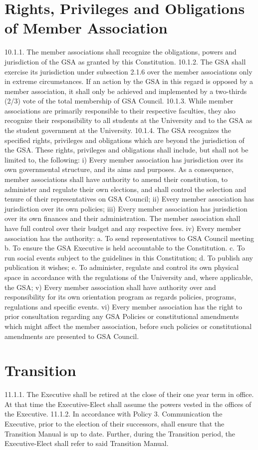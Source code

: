 \section{Rights, Privileges and Obligations of Member Association }
10.1.1. The member associations shall recognize the obligations, powers 
and jurisdiction of the GSA as granted by this Constitution. 
10.1.2. The GSA shall exercise its jurisdiction under subsection 2.1.6 over 
the member associations only in extreme circumstances. If an action 
by the GSA in this regard is opposed by a member association, it shall 
only be achieved and implemented by a two-thirds (2/3) vote of the 
total membership of GSA Council. 
10.1.3. While member associations are primarily responsible to their 
respective faculties, they also recognize their responsibility to all 
students at the University and to the GSA as the student government at 
the University. 
10.1.4. The GSA recognizes the specified rights, privileges and obligations 
which are beyond the jurisdiction of the GSA. These rights, privileges 
and obligations shall include, but shall not be limited to, the following: 
i) Every member association has jurisdiction over its own governmental 
structure, and its aims and purposes. As a consequence, member 
associations shall have authority to amend their constitution, to 
administer and regulate their own elections, and shall control the 
selection and tenure of their representatives on GSA Council; 
ii) Every member association has jurisdiction over its own policies; 
iii) Every member association has jurisdiction over its own finances and 
their administration. The member association shall have full control 
over their budget and any respective fees. 
iv) Every member association has the authority: 
a. To send representatives to GSA Council meeting 
b. To ensure the GSA Executive is held accountable to the 
 Constitution. 
c. To run social events subject to the guidelines in this Constitution; 
d. To publish any publication it wishes; 
e. To administer, regulate and control its own physical space in 
 accordance with the regulations of the University and, where 
 applicable, the GSA; 
v) Every member association shall have authority over and responsibility 
for its own orientation program as regards policies, programs, 
regulations and specific events. 
vi) Every member association has the right to prior consultation regarding 
any GSA Policies or constitutional amendments which might affect the member association, before such policies or constitutional 
amendments are presented to GSA Council. 
\section{Transition }
11.1.1. The Executive shall be retired at the close of their one year term in 
office. At that time the Executive-Elect shall assume the powers vested 
in the offices of the Executive. 
11.1.2. In accordance with Policy 3. Communication the Executive, prior 
to the election of their successors, shall ensure that the Transition 
Manual is up to date. Further, during the Transition period, the 
Executive-Elect shall refer to said Transition Manual. 
